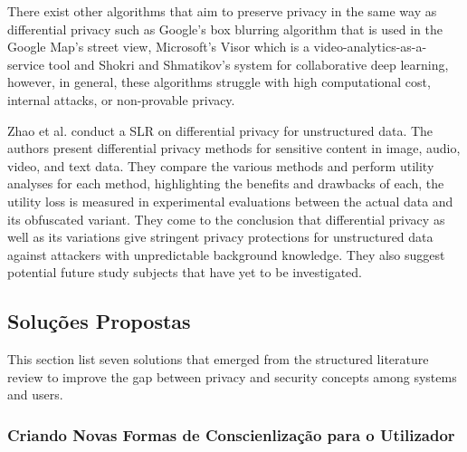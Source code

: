 \documentclass[conference]{IEEEtran}
\begin{document}

There exist other algorithms that aim to preserve privacy in the same way
as differential privacy such as Google's box blurring algorithm \cite{FromeLarge}
that is used in the Google Map's street view, Microsoft's Visor \cite{poddar2020visor}
which is a video-analytics-as-a-service tool and Shokri and Shmatikov's
\cite{ShokriPrivacy} system for collaborative deep learning, however, in
general, these algorithms struggle with high computational cost, internal
attacks, or non-provable privacy.

Zhao et al. \cite{ZhaoSurvey} conduct a SLR on differential privacy for
unstructured data. The authors present differential privacy methods for
sensitive content in image, audio, video, and text data. They compare the
various methods and perform utility analyses for each method, highlighting
the benefits and drawbacks of each, the utility loss is measured in experimental
evaluations between the actual data and its obfuscated variant. They come
to the conclusion that differential privacy as well as its variations give
stringent privacy protections for unstructured data against attackers with
unpredictable background knowledge. They also suggest potential future study
subjects that have yet to be investigated.

\subsection{Soluções Propostas}

\par This section list seven solutions that emerged from the structured
literature review to improve the gap between privacy and security concepts
among systems and users.

\subsubsection{Criando Novas Formas de Conscienlização para o Utilizador}
\end{document}
